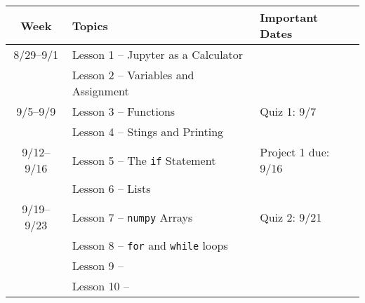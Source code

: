 \documentclass[12pt]{article}
\begin{document}
\sffamily

\begin{tabularx}{\textwidth}{ |c|X|l|} \hline
  \textbf{Week} & \textbf{Topics} & \textbf{Important Dates}  \\\hline\hline 
8/29--9/1   & Lesson 1 -- Jupyter as a Calculator & \\
            & Lesson 2 -- Variables and Assignment & \\\hline
9/5--9/9    & Lesson 3 -- Functions & Quiz 1: 9/7\\
            & Lesson 4 --  Stings and Printing & \\\hline
9/12--9/16  & Lesson 5 --  The \texttt{if} Statement & Project 1 due: 9/16\\
            & Lesson 6 --  Lists & \\\hline
9/19--9/23  & Lesson 7 --  \texttt{numpy} Arrays & Quiz 2: 9/21\\
            & Lesson 8 --  \texttt{for} and \texttt{while} loops& \\\hline
            & Lesson 9 --   & \\
            & Lesson 10 --  & \\\hline
   
   
\end{tabularx}
\end{document}
